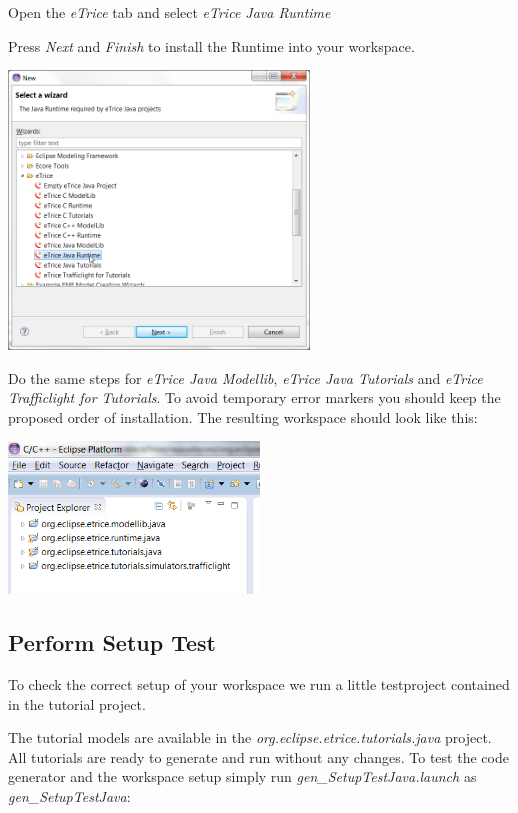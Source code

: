 Open the \emph{eTrice} tab and select \textit{eTrice Java Runtime}

Press \emph{Next} and \emph{Finish} to install the Runtime into your workspace.

\includegraphics[width=0.6\textwidth]{images/013-SetupWorkspace03.png}

\newpage
Do the same steps for \textit{eTrice Java Modellib}, \textit{eTrice Java Tutorials} and \textit{eTrice Trafficlight for Tutorials}. To avoid temporary 
error markers you should keep the proposed order of installation. The resulting workspace should look like 
this:

\includegraphics[width=0.5\textwidth]{images/013-SetupWorkspace04.png}

\subsection{Perform Setup Test}

To check the correct setup of your workspace we run a little testproject contained in the tutorial project.

The tutorial models are available in the \textit{org.eclipse.etrice.tutorials.java} project. All tutorials are 
ready to generate and run without any changes. To test the code generator and the workspace setup simply run 
\emph{gen\_SetupTestJava.launch} as \emph{gen\_SetupTestJava}: 


